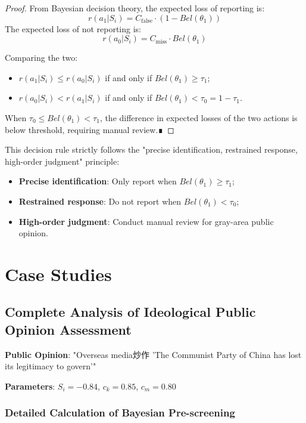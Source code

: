 \documentclass[11pt,a4paper]{report}
\begin{document}
\begin{proof}
From Bayesian decision theory, the expected loss of reporting is:
\[
r(a_1|S_i) = C_{\text{false}} \cdot (1 - Bel(\theta_1))
\]
The expected loss of not reporting is:
\[
r(a_0|S_i) = C_{\text{miss}} \cdot Bel(\theta_1)
\]

Comparing the two:
\begin{itemize}
    \item $r(a_1|S_i) \leq r(a_0|S_i)$ if and only if $Bel(\theta_1) \geq \tau_1$;
    \item $r(a_0|S_i) < r(a_1|S_i)$ if and only if $Bel(\theta_1) < \tau_0 = 1 - \tau_1$.
\end{itemize}

When $\tau_0 \leq Bel(\theta_1) < \tau_1$, the difference in expected losses of the two actions is below threshold, requiring manual review.∎
\end{proof}

This decision rule strictly follows the "precise identification, restrained response, high-order judgment" principle:
\begin{itemize}
    \item \textbf{Precise identification}: Only report when $Bel(\theta_1) \geq \tau_1$;
    \item \textbf{Restrained response}: Do not report when $Bel(\theta_1) < \tau_0$;
    \item \textbf{High-order judgment}: Conduct manual review for gray-area public opinion.
\end{itemize}

\section{Case Studies}

\subsection{Complete Analysis of Ideological Public Opinion Assessment}

\textbf{Public Opinion}: "Overseas media炒作 'The Communist Party of China has lost its legitimacy to govern'"

\textbf{Parameters}: $S_i = -0.84$, $c_k = 0.85$, $c_m = 0.80$

\subsubsection{Detailed Calculation of Bayesian Pre-screening}
\end{document}
